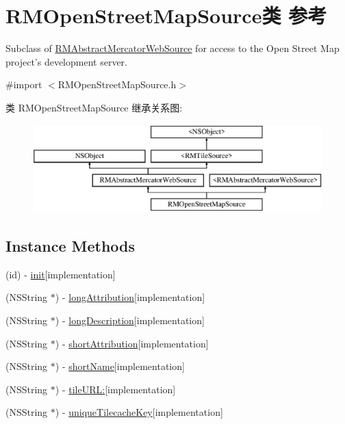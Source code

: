 \hypertarget{interface_r_m_open_street_map_source}{\section{R\-M\-Open\-Street\-Map\-Source类 参考}
\label{interface_r_m_open_street_map_source}
}


Subclass of \hyperlink{interface_r_m_abstract_mercator_web_source}{R\-M\-Abstract\-Mercator\-Web\-Source} for access to the Open Street Map project's development server.  




{\ttfamily \#import $<$R\-M\-Open\-Street\-Map\-Source.\-h$>$}

类 R\-M\-Open\-Street\-Map\-Source 继承关系图\-:\begin{figure}[H]
\begin{center}
\leavevmode
\includegraphics[height=3.425076cm]{interface_r_m_open_street_map_source}
\end{center}
\end{figure}
\subsection*{Instance Methods}
\begin{DoxyCompactItemize}
\item 
(id) -\/ \hyperlink{interface_r_m_open_street_map_source_ad2c425f72e1d6342eb533a64426c1ecc}{init}{\ttfamily  \mbox{[}implementation\mbox{]}}
\item 
(N\-S\-String $\ast$) -\/ \hyperlink{interface_r_m_open_street_map_source_a932b3f4e2d2015eaadae1e5876f3fd14}{long\-Attribution}{\ttfamily  \mbox{[}implementation\mbox{]}}
\item 
(N\-S\-String $\ast$) -\/ \hyperlink{interface_r_m_open_street_map_source_acf8470afa308a44db7eab70e1366c570}{long\-Description}{\ttfamily  \mbox{[}implementation\mbox{]}}
\item 
(N\-S\-String $\ast$) -\/ \hyperlink{interface_r_m_open_street_map_source_a9ff8d53d553a5fd3e091a1dec5d720fe}{short\-Attribution}{\ttfamily  \mbox{[}implementation\mbox{]}}
\item 
(N\-S\-String $\ast$) -\/ \hyperlink{interface_r_m_open_street_map_source_a2c36d88b3653099053eb46129a245a55}{short\-Name}{\ttfamily  \mbox{[}implementation\mbox{]}}
\item 
(N\-S\-String $\ast$) -\/ \hyperlink{interface_r_m_open_street_map_source_a3d2b2c15f17ca1ab3d1862ffb1feb2e3}{tile\-U\-R\-L\-:}{\ttfamily  \mbox{[}implementation\mbox{]}}
\item 
(N\-S\-String $\ast$) -\/ \hyperlink{interface_r_m_open_street_map_source_a6bf79a7fd62c28cb11979a7d4bdb65b9}{unique\-Tilecache\-Key}{\ttfamily  \mbox{[}implementation\mbox{]}}
\end{DoxyCompactItemize}
